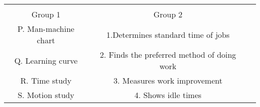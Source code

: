 \begin{center}
\begin{tabular} {|c|c|c|} 
\hline \\
{Group 1} & {Group 2} \\ \hline
P. Man\--machine chart &  1.Determines standard time of jobs \\ \hline
Q. Learning curve  &  2. Finds the preferred method of doing work \\ \hline 
R. Time study  & 3. Measures work improvement  \\ \hline
S. Motion study  & 4. Shows idle times  \\ \hline
\end{tabular}
\end{center}